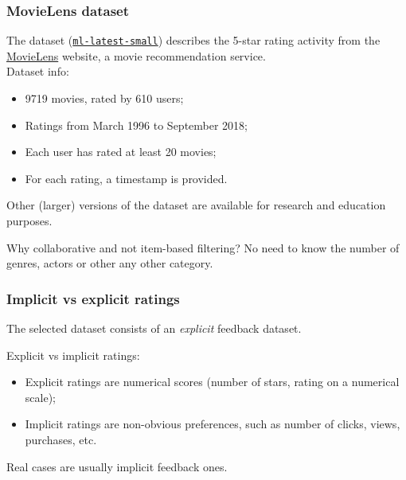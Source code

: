 \documentclass[xcolor = {table}]{beamer}
\begin{document}
  \begin{frame}
    \frametitle{MovieLens dataset}

    The dataset (\texttt{\href{https://grouplens.org/datasets/movielens/}{ml-latest-small}}) describes the 5-star rating activity from the \href{https://movielens.org/}{MovieLens} website, a movie recommendation service. \\
    \vspace{1em}
    Dataset info:
    \begin{itemize}
      \item 9719 movies, rated by 610 users;
      \item Ratings from March 1996 to September 2018;
      \item Each user has rated at least 20 movies;
      \item For each rating, a timestamp is provided.
    \end{itemize}

    \vspace{1em}

    Other (larger) versions of the dataset are available for research and education purposes.

    \vspace{1em}

    \pause

    \begin{block}{Why collaborative and not item-based filtering?}
      No need to know the number of genres, actors or other any other category.
    \end{block}

  \end{frame}



  \begin{frame}
    \frametitle{Implicit vs explicit ratings}

    The selected dataset consists of an \textit{explicit} feedback dataset.

    \vspace{1em}

    Explicit vs implicit ratings:

    \vspace{0.5em}

    \begin{itemize}
      \setlength\itemsep{1em}
      \item Explicit ratings are numerical scores (number of stars, rating on a numerical scale);\
      \item Implicit ratings are non-obvious preferences, such as number of clicks, views, purchases, etc.
    \end{itemize}

    \vspace{1em}

    Real cases are usually implicit feedback ones.

  \end{frame}
\end{document}

